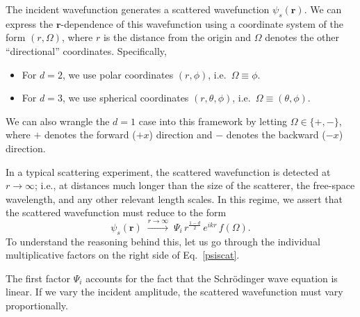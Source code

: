 \documentclass[pra,12pt]{revtex4-2}
\begin{document}
The incident wavefunction generates a scattered wavefunction
$\psi_s(\mathbf{r})$.  We can express the $\mathbf{r}$-dependence of
this wavefunction using a coordinate system of the form $(r,\Omega)$,
where $r$ is the distance from the origin and $\Omega$ denotes the
other ``directional'' coordinates.  Specifically,
\begin{itemize}
\item For $d = 2$, we use polar coordinates $(r,\phi)$, i.e.~$\Omega
  \equiv \phi$.

\item For $d = 3$, we use spherical coordinates $(r, \theta, \phi)$,
  i.e.~$\Omega \equiv (\theta,\phi)$.
\end{itemize}
We can also wrangle the $d = 1$ case into this framework by letting
$\Omega \in \{+, -\}$, where $+$ denotes the forward ($+x$) direction
and $-$ denotes the backward ($-x$) direction.

In a typical scattering experiment, the scattered wavefunction is
detected at $r \rightarrow \infty$; i.e., at distances much longer
than the size of the scatterer, the free-space wavelength, and any
other relevant length scales.  In this regime, we assert that the
scattered wavefunction must reduce to the form
\begin{equation}
  \psi_s(\mathbf{r})\;  \overset{r\rightarrow\infty}{\longrightarrow}\; \Psi_i \, r^{\frac{1-d}{2}} \, e^{ikr} \, f(\Omega).
  \label{psiscat}
\end{equation}
To understand the reasoning behind this, let us go through the
individual multiplicative factors on the right side of
Eq.~\eqref{psiscat}.

The first factor $\Psi_i$ accounts for the fact that the Schr\"odinger
wave equation is linear.  If we vary the incident amplitude, the
scattered wavefunction must vary proportionally.
\end{document}

